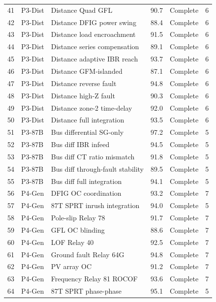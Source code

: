 \documentclass[11pt,a4paper]{report}
\newcommand{\cmark}{\ding{51}}
\begin{document}
\begin{longtable}{@{}p{0.7cm}p{1.2cm}p{4.5cm}p{1.3cm}p{1.5cm}p{1.0cm}@{}}
41 & P3-Dist & Distance Quad GFL & 90.7 & \cmark Complete & 6 \\
42 & P3-Dist & Distance DFIG power swing & 88.4 & \cmark Complete & 6 \\
43 & P3-Dist & Distance load encroachment & 91.5 & \cmark Complete & 6 \\
44 & P3-Dist & Distance series compensation & 89.1 & \cmark Complete & 6 \\
45 & P3-Dist & Distance adaptive IBR reach & 93.7 & \cmark Complete & 6 \\
46 & P3-Dist & Distance GFM-islanded & 87.1 & \cmark Complete & 6 \\
47 & P3-Dist & Distance reverse fault & 94.8 & \cmark Complete & 6 \\
48 & P3-Dist & Distance high-Z fault & 90.3 & \cmark Complete & 6 \\
49 & P3-Dist & Distance zone-2 time-delay & 92.0 & \cmark Complete & 6 \\
50 & P3-Dist & Distance full integration & 93.5 & \cmark Complete & 6 \\
51 & P3-87B & Bus differential SG-only & 97.2 & \cmark Complete & 5 \\
52 & P3-87B & Bus diff IBR infeed & 94.5 & \cmark Complete & 5 \\
53 & P3-87B & Bus diff CT ratio mismatch & 91.8 & \cmark Complete & 5 \\
54 & P3-87B & Bus diff through-fault stability & 89.5 & \cmark Complete & 5 \\
55 & P3-87B & Bus diff full integration & 94.1 & \cmark Complete & 5 \\
56 & P4-Gen & DFIG OC coordination & 93.2 & \cmark Complete & 7 \\
57 & P4-Gen & 87T SPRT inrush integration & 94.0 & \cmark Complete & 5 \\
58 & P4-Gen & Pole-slip Relay 78 & 91.7 & \cmark Complete & 7 \\
59 & P4-Gen & GFL OC blinding & 88.6 & \cmark Complete & 7 \\
60 & P4-Gen & LOF Relay 40 & 92.5 & \cmark Complete & 7 \\
61 & P4-Gen & Ground fault Relay 64G & 94.8 & \cmark Complete & 7 \\
62 & P4-Gen & PV array OC & 91.2 & \cmark Complete & 7 \\
63 & P4-Gen & Frequency Relay 81 ROCOF & 93.6 & \cmark Complete & 7 \\
64 & P4-Gen & 87T SPRT phase-phase & 95.1 & \cmark Complete & 5 \\

\end{longtable}
\end{document}
